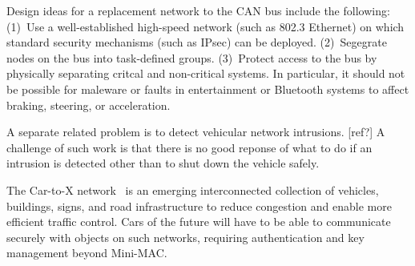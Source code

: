 Design ideas for a replacement network to the CAN bus include the following:  
(1)~Use a well-established high-speed network (such as 802.3 Ethernet) on which
standard security mechanisms (such as IPsec) can be deployed.
(2)~Segegrate nodes on the bus into task-defined groups.
(3)~Protect access to the bus by physically separating critcal and non-critical systems.
In particular, it should not be possible for maleware or faults in entertainment or 
Bluetooth systems to affect braking, steering, or acceleration.  

A separate related problem is to detect vehicular network intrusions. [ref?]  A challenge of such work is that
there is no good reponse of what to do if an intrusion is detected other than to shut down the vehicle safely.

The Car-to-X network~\cite{C2X} is an emerging interconnected collection of vehicles, buildings, signs, and road infrastructure 
to reduce congestion and enable more efficient traffic control. Cars of the future will have to be able to communicate
securely with objects on such networks, requiring authentication and key management beyond Mini-MAC.


